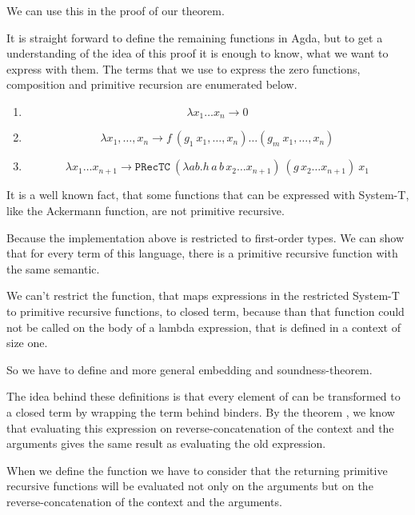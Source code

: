 \documentclass{jfp}
\newcommand{\xn}{x_1,\dots,x_n }
\begin{document}
\mkProj

\lookupOpRev

We can use this in the proof of our theorem.
\prToStProj
\embedPRSTSoundProj

It is straight forward to define the remaining functions in Agda, but to get a understanding of the idea of this proof it is enough to know, what we want to express with them. The terms that we use to express the zero functions, composition and primitive recursion are enumerated below.

\begin{enumerate}
	\item $$\lambda x_1 \dots x_{n} \rightarrow 0 $$
	\item $$\lambda \xn \rightarrow  f \ (g_1 \ \xn) \dots (g_m \ \xn) $$
	\item $$\lambda x_1 \dots x_{n+1} \rightarrow \mathtt{PRecTC} \ (\lambda a b . h \, a \, b \, x_2 \dots x_{n+1}) \ (g \, x_2 \dots x_{n+1}) \ x_1 $$
\end{enumerate}


It is a well known fact, that some functions that can be expressed with System-T, like the Ackermann function, are not primitive recursive. 

Because the implementation above is restricted to first-order types. We can show that for every term of this language, there is a primitive recursive function with the same semantic. 

We can't restrict the function, that maps expressions in the restricted System-T to primitive recursive functions, to closed term, because than that function could not be called on the body of a lambda expression, that is defined in a context of size one.  


So we have to define and more general embedding and soundness-theorem.


\sTtoPRSignature

\sTtoPRSoundSig

The idea behind these definitions is that every element of  can be transformed to a closed term by wrapping the term behind  binders. By the theorem , we know that evaluating this  expression on reverse-concatenation of the context and the arguments gives the same result as evaluating the old expression.


When we define the function  we have to consider that the returning primitive recursive functions will be evaluated not only on the arguments but on the reverse-concatenation of the context and the arguments.
\end{document}
